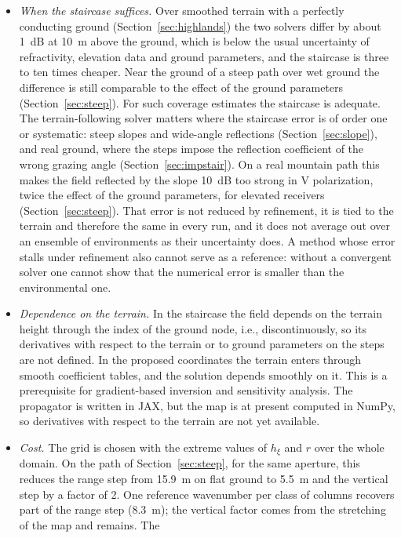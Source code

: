 \documentclass[journal]{IEEEtran}
\begin{document}
\begin{itemize}
\item \emph{When the staircase suffices.} Over smoothed terrain with a
perfectly conducting ground (Section~\ref{sec:highlands}) the two solvers differ
by about \SI{1}{dB} at \SI{10}{m} above the ground, which is below the usual
uncertainty of refractivity, elevation data and ground parameters, and the
staircase is three to ten times cheaper. Near the ground of a steep path over wet
ground the difference is still comparable to the effect of the ground
parameters (Section~\ref{sec:steep}). For such coverage estimates the
staircase is adequate. The terrain-following solver matters where the staircase
error is of order one or systematic: steep slopes and wide-angle reflections
(Section~\ref{sec:slope}), and real ground, where the steps impose the
reflection coefficient of the wrong grazing angle
(Section~\ref{sec:impstair}). On a real mountain path this makes the field
reflected by the slope \SI{10}{dB} too strong in V polarization, twice the
effect of the ground parameters, for elevated receivers
(Section~\ref{sec:steep}). That error is not reduced by refinement, it is
tied to the terrain and therefore the same in every run, and it does not average
out over an ensemble of environments as their uncertainty does. A method whose
error stalls under refinement also cannot serve as a reference: without a
convergent solver one cannot show that the numerical error is smaller than the
environmental one.
\item \emph{Dependence on the terrain.} In the staircase the field depends on
the terrain height through the index of the ground node, i.e., discontinuously,
so its derivatives with respect to the terrain or to ground parameters on the
steps are not defined. In the proposed coordinates the terrain enters through
smooth coefficient tables, and the solution depends smoothly on it. This is a
prerequisite for gradient-based inversion and sensitivity analysis. The
propagator is written in JAX, but the map is at present computed in NumPy, so
derivatives with respect to the terrain are not yet available.
\item \emph{Cost.} The grid is chosen with the extreme values of $h_\xi$ and $r$
over the whole domain. On the path of Section~\ref{sec:steep}, for the same
aperture, this reduces the range step from \SI{15.9}{m} on flat ground to
\SI{5.5}{m} and the vertical step by a factor of 2. One reference wavenumber
per class of columns recovers part of the range step (\SI{8.3}{m}); the
vertical factor comes from the stretching of the map and remains. The

\end{itemize}
\end{document}
